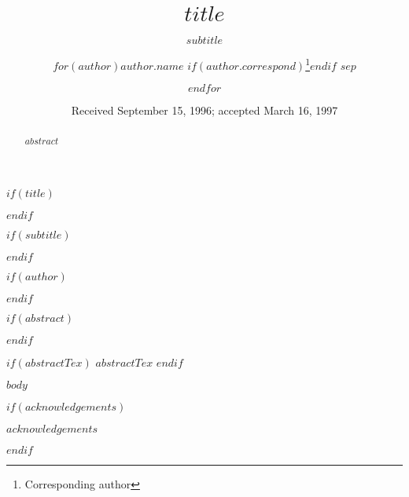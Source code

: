 \documentclass{aa}
\begin{document}
$if(title)$
  \title{$title$}
$endif$

$if(subtitle)$
  \subtitle{$subtitle$}
$endif$

$if(author)$

  \author{$for(author)$$author.name$
         $if(author.correspond)$\fnmsep\thanks{Corresponding author}$endif$
         $sep$\and $endfor$}

$endif$

   \date{Received September 15, 1996; accepted March 16, 1997}


$if(abstract)$
\begin{abstract}
  $abstract$
\end{abstract}
$endif$

$if(abstractTex)$
 $abstractTex$
$endif$


   \maketitle
%

$body$

$if(acknowledgements)$
\begin{acknowledgements}
$acknowledgements$
\end{acknowledgements}
$endif$
\end{document}
